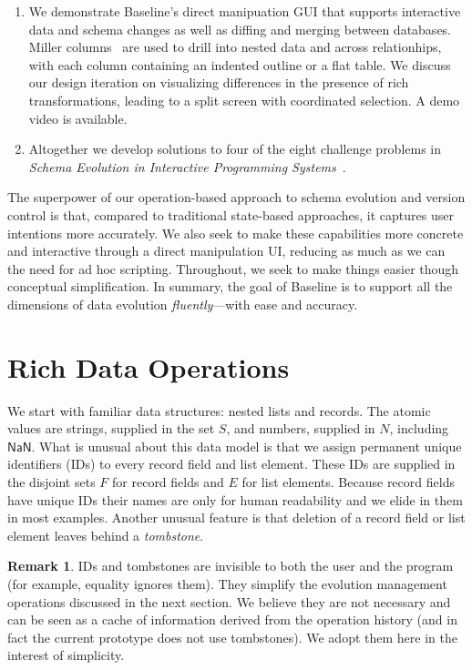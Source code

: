 \documentclass[english,submission]{programming}
\theoremstyle{definition}
\newtheorem*{remark}{Remark}
\newcommand{\mathbox}[1]{\colorbox{black!10}{$#1$}}
\begin{document}
\begin{enumerate}
\item We demonstrate Baseline's direct manipuation GUI that supports interactive data and schema changes as well as diffing and merging between databases.
Miller columns~\cite{miller-columns} are used to drill into nested data and across relationhips, with each column containing an indented outline or a flat table. We discuss our design iteration on visualizing differences in the presence of rich transformations, leading to a split screen with coordinated selection. A demo video is available.

\item Altogether we develop solutions to four of the eight challenge problems in \textit{Schema Evolution in Interactive Programming Systems}~\cite{challenge-problems}.

\end{enumerate}

The superpower of our operation-based approach to schema evolution and version control is that, compared to traditional state-based approaches, it captures user intentions more accurately. We also seek to make these capabilities more concrete and interactive through a direct manipulation UI, reducing as much as we can the need for ad hoc scripting. Throughout, we seek to make things easier though conceptual simplification.
In summary, the goal of Baseline is to support all the dimensions of data evolution \textit{fluently}---with ease and accuracy.






\section{Rich Data Operations}\label{rich-data}

We start with familiar data structures: nested lists and records. The atomic values are strings, supplied in the set \mathbox{S}, and numbers, supplied in \mathbox{N}, including \mathbox{\textsf{NaN}}. What is unusual about this data model is that we assign permanent unique identifiers (IDs) to every record field and list element. These IDs are supplied in the disjoint sets \mathbox{F} for record fields and \mathbox{E} for list elements. Because record fields have unique IDs their names are only for human readability and we elide in them in most examples. Another unusual feature is that deletion of a record field or list element leaves behind a \textit{tombstone}.

\begin{remark}
IDs and tombstones are invisible to both the user and the program (for example, equality ignores them). They simplify the evolution management operations discussed in the next section. We believe they are not necessary and can be seen as a cache of information derived from the operation history (and in fact the current prototype does not use tombstones). We adopt them here in the interest of simplicity.
\end{remark}
\end{document}
